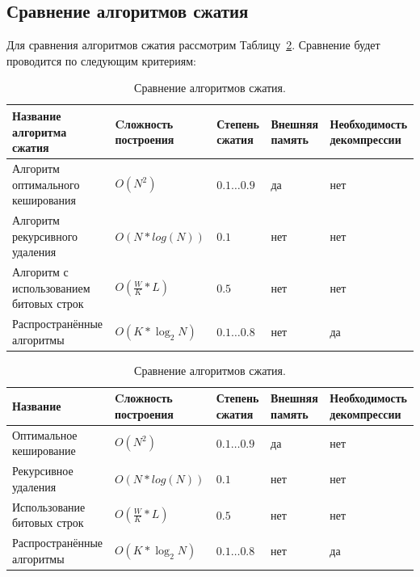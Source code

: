 \documentclass[oneside,final,12pt]{extarticle}
\begin{document}
        \subsection{Сравнение алгоритмов сжатия}
             Для сравнения алгоритмов сжатия рассмотрим Таблицу~\ref{tab:tab1}. Сравнение будет проводится по следующим критериям:
        \begin{table}[ht]
            \caption{Сравнение алгоритмов сжатия.}\label{tab:tab1}
            \begin{tabular}{|m{4.3cm}|m{2.5cm}|m{2cm}|m{2cm}|m{3.3cm}|}
                \hline
                \bf Название алгоритма сжатия & \bf Cложность построения & \bf Степень сжатия & \bf Внешняя память & \bf Необходимость декомпрессии \\
                \hline
                Алгоритм оптимального кеширования & $O(N^2)$ & \(0.1 \ldots 0.9\) & да & нет \\
                \hline
                Алгоритм рекурсивного удаления & $O(N*log(N))$ & \(0.1\) & нет & нет \\
                \hline
                Алгоритм с использованием битовых строк & $O(\frac{W}{K}*L)$ & \(0.5\) & нет & нет \\
                \hline
                Распространённые алгоритмы & $O(K*\log_2{N})$ & \(0.1 \ldots 0.8\) & нет & да \\
                \hline
            \end{tabular}
        \end{table}
        \fi
        \begin{table}[!t]
            \centering
            \caption{Сравнение алгоритмов сжатия.}\label{tab:tab1}
            \begin{tabularx}{\textwidth}{m{4.3cm}m{2.5cm}m{2cm}m{2cm}m{3.3cm}}
                \toprule
                \bf Название & \bf Cложность построения & \bf Степень сжатия & \bf Внешняя память & \bf Необходимость декомпрессии \\
                \midrule
                Оптимальное кеширование & $O(N^2)$ & \(0.1 \ldots 0.9\) & да & нет \\
                Рекурсивное удаления & $O(N*log(N))$ & \(0.1\) & нет & нет \\
                Использование битовых строк & $O(\frac{W}{K}*L)$ & \(0.5\) & нет & нет \\
                Распространённые алгоритмы & $O(K*\log_2{N})$ & \(0.1 \ldots 0.8\) & нет & да \\
                \bottomrule
            \end{tabularx}
        \end{table}
        
\end{document}
